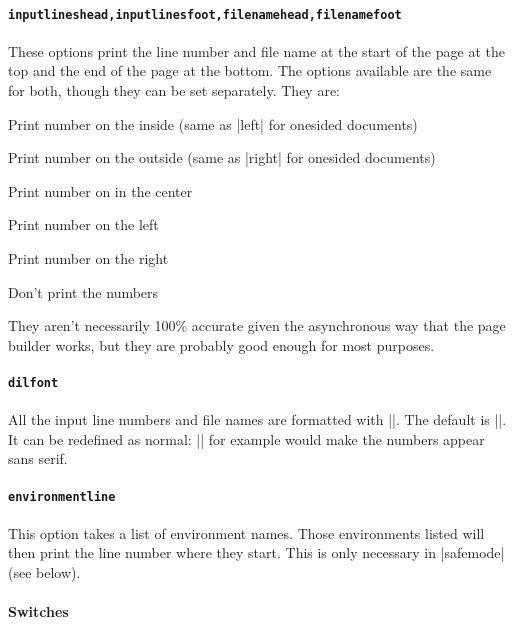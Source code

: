 \documentclass[twoside]{scrartcl}
\begin{document}
\paragraph{\lstinline+inputlineshead,inputlinesfoot,filenamehead,filenamefoot+}

These options print the line number and file name at the start of the
page at the top and the end of the page at the bottom. 
The options available are the same for both, though they can be set separately. 
They are:
\begin{description}[labelindent=1cm]
\item[inside] Print number on the inside (same as |left| for onesided
  documents)
\item[outside] Print number on the outside (same as |right| for
  onesided documents)
\item[center] Print number on in the center
\item[left] Print number on the left
\item[right] Print number on the right
\item[off] Don't print the numbers
\end{description}

They aren't necessarily 100\% accurate given the asynchronous way that
the page builder works, but they are probably good enough for most purposes.

\paragraph{\lstinline+dilfont+}

All the input line numbers and file names are formatted with |\dilfont|.
The default is |\ttfamily\small|.
It can be redefined as normal:
|\def\dilfont{\small\sffamily}| for example would make the numbers
appear sans serif.

\paragraph{\lstinline+environmentline+}

This option takes a list of environment names.
Those environments listed will then print the line number where they
start.
This is only necessary in |safemode| (see below).

\paragraph{Switches}
\end{document}
